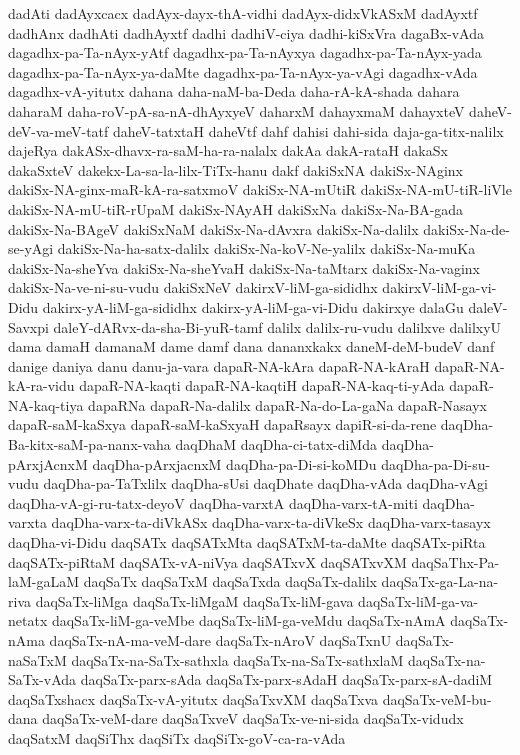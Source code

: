 {dadAti
dadAyxcacx
dadAyx-dayx-thA-vidhi
dadAyx-didxVkASxM
dadAyxtf
dadhAnx
dadhAti
dadhAyxtf
dadhi
dadhiV-ciya
dadhi-kiSxVra
dagaBx-vAda
dagadhx-pa-Ta-nAyx-yAtf
dagadhx-pa-Ta-nAyxya
dagadhx-pa-Ta-nAyx-yada
dagadhx-pa-Ta-nAyx-ya-daMte
dagadhx-pa-Ta-nAyx-ya-vAgi
dagadhx-vAda
dagadhx-vA-yitutx
dahana
daha-naM-ba-Deda
daha-rA-kA-shada
dahara
daharaM
daha-roV-pA-sa-nA-dhAyxyeV
daharxM
dahayxmaM
dahayxteV
daheV-deV-va-meV-tatf
daheV-tatxtaH
daheVtf
dahf
dahisi
dahi-sida
daja-ga-titx-nalilx
dajeRya
dakASx-dhavx-ra-saM-ha-ra-nalalx
dakAa
dakA-rataH
dakaSx
dakaSxteV
dakekx-La-sa-la-lilx-TiTx-hanu
dakf
dakiSxNA
dakiSx-NAginx
dakiSx-NA-ginx-maR-kA-ra-satxmoV
dakiSx-NA-mUtiR
dakiSx-NA-mU-tiR-liVle
dakiSx-NA-mU-tiR-rUpaM
dakiSx-NAyAH
dakiSxNa
dakiSx-Na-BA-gada
dakiSx-Na-BAgeV
dakiSxNaM
dakiSx-Na-dAvxra
dakiSx-Na-dalilx
dakiSx-Na-de-se-yAgi
dakiSx-Na-ha-satx-dalilx
dakiSx-Na-koV-Ne-yalilx
dakiSx-Na-muKa
dakiSx-Na-sheYva
dakiSx-Na-sheYvaH
dakiSx-Na-taMtarx
dakiSx-Na-vaginx
dakiSx-Na-ve-ni-su-vudu
dakiSxNeV
dakirxV-liM-ga-sididhx
dakirxV-liM-ga-vi-Didu
dakirx-yA-liM-ga-sididhx
dakirx-yA-liM-ga-vi-Didu
dakirxye
dalaGu
daleV-Savxpi
daleY-dARvx-da-sha-Bi-yuR-tamf
dalilx
dalilx-ru-vudu
dalilxve
dalilxyU
dama
damaH
damanaM
dame
damf
dana
dananxkakx
daneM-deM-budeV
danf
danige
daniya
danu
danu-ja-vara
dapaR-NA-kAra
dapaR-NA-kAraH
dapaR-NA-kA-ra-vidu
dapaR-NA-kaqti
dapaR-NA-kaqtiH
dapaR-NA-kaq-ti-yAda
dapaR-NA-kaq-tiya
dapaRNa
dapaR-Na-dalilx
dapaR-Na-do-La-gaNa
dapaR-Nasayx
dapaR-saM-kaSxya
dapaR-saM-kaSxyaH
dapaRsayx
dapiR-si-da-rene
daqDha-Ba-kitx-saM-pa-nanx-vaha
daqDhaM
daqDha-ci-tatx-diMda
daqDha-pArxjAcnxM
daqDha-pArxjacnxM
daqDha-pa-Di-si-koMDu
daqDha-pa-Di-su-vudu
daqDha-pa-TaTxlilx
daqDha-sUsi
daqDhate
daqDha-vAda
daqDha-vAgi
daqDha-vA-gi-ru-tatx-deyoV
daqDha-varxtA
daqDha-varx-tA-miti
daqDha-varxta
daqDha-varx-ta-diVkASx
daqDha-varx-ta-diVkeSx
daqDha-varx-tasayx
daqDha-vi-Didu
daqSATx
daqSATxMta
daqSATxM-ta-daMte
daqSATx-piRta
daqSATx-piRtaM
daqSATx-vA-niVya
daqSATxvX
daqSATxvXM
daqSaThx-Pa-laM-gaLaM
daqSaTx
daqSaTxM
daqSaTxda
daqSaTx-dalilx
daqSaTx-ga-La-na-riva
daqSaTx-liMga
daqSaTx-liMgaM
daqSaTx-liM-gava
daqSaTx-liM-ga-va-netatx
daqSaTx-liM-ga-veMbe
daqSaTx-liM-ga-veMdu
daqSaTx-nAmA
daqSaTx-nAma
daqSaTx-nA-ma-veM-dare
daqSaTx-nAroV
daqSaTxnU
daqSaTx-naSaTxM
daqSaTx-na-SaTx-sathxla
daqSaTx-na-SaTx-sathxlaM
daqSaTx-na-SaTx-vAda
daqSaTx-parx-sAda
daqSaTx-parx-sAdaH
daqSaTx-parx-sA-dadiM
daqSaTxshacx
daqSaTx-vA-yitutx
daqSaTxvXM
daqSaTxva
daqSaTx-veM-bu-dana
daqSaTx-veM-dare
daqSaTxveV
daqSaTx-ve-ni-sida
daqSaTx-vidudx
daqSatxM
daqSiThx
daqSiTx
daqSiTx-goV-ca-ra-vAda
}
